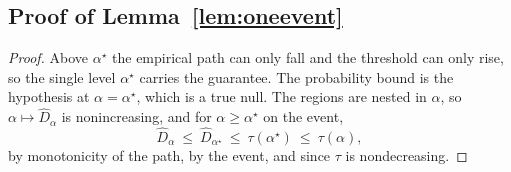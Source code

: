 \subsection{Proof of Lemma~\ref{lem:oneevent}}

\begin{proof}
Above $\alpha^\star$ the empirical path can only fall and the threshold can only rise, so the single level
$\alpha^\star$ carries the guarantee. The probability bound is the hypothesis at $\alpha=\alpha^\star$, which is a true
null. The regions are nested in
$\alpha$, so $\alpha\mapsto\widehat D_\alpha$ is nonincreasing, and for $\alpha\ge\alpha^\star$ on the event,
\[
\widehat D_\alpha\ \le\ \widehat D_{\alpha^\star}\ \le\ \tau(\alpha^\star)\ \le\ \tau(\alpha),
\]
by monotonicity of the path, by the event, and since $\tau$ is nondecreasing.
\end{proof}
